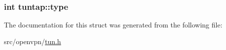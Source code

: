 \subsubsection[{type}]{\setlength{\rightskip}{0pt plus 5cm}int tuntap\+::type}\label{structtuntap_a33cc194495f4f5cac85cd788defc2350}


The documentation for this struct was generated from the following file\+:\begin{DoxyCompactItemize}
\item 
src/openvpn/\hyperlink{tun_8h}{tun.\+h}\end{DoxyCompactItemize}
